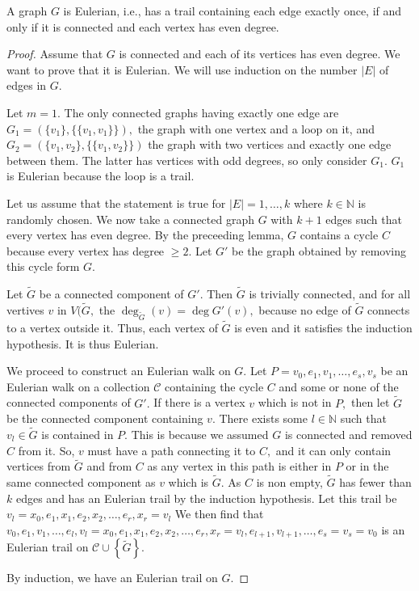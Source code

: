 \begin{theorem}
	A graph $G$ is Eulerian, i.e., has a trail containing each edge exactly once, if and only if it is connected and each vertex has even degree.
\end{theorem}
\begin{proof}
	Assume that $G$ is connected and each of its vertices has even degree. We want to prove that it is Eulerian. We will use induction on the number $ \lvert E \rvert$ of edges in $G.$

	Let $m = 1.$ The only connected graphs having exactly one edge are $ G_1 =  ( \{v_1\}, \{\{v_1,v_1\}\} ),$ the graph with one vertex and a loop on it, and $G_2 = ( \{v_1, v_2\}, \{\{v_1,v_2\}\})$ the graph with two vertices and exactly one edge between them. The latter has vertices with odd degrees, so only consider $G_1.$
$G_1$ is Eulerian because the loop is a trail.

Let us assume that the statement is true for $ \lvert E \rvert = 1, \dotsc, k$ where $k \in \mathbb{N}$ is randomly chosen.
We now take a connected graph $G$ with $k+1$ edges such that every vertex has even degree.
By the preceeding lemma, $G$ contains a cycle $C$ because every vertex has degree $\geq 2.$
Let $G'$ be the graph obtained by removing this cycle form $G.$

Let $\tilde{G}$ be a connected component of $G'.$
Then $\tilde{G}$ is trivially connected, and for all vertives $v$ in $V(\tilde{G},$
the $\deg_{\tilde{G}}(v) = \deg{G'}(v),$ because no edge of $\tilde{G}$ connects to a
vertex outside it.
Thus, each vertex of $\tilde{G}$ is even and it satisfies the induction hypothesis.
It is thus Eulerian.

We proceed to construct an Eulerian walk on $G.$
Let $P = v_0, e_1, v_1, \dotsc, e_s, v_s$ be an Eulerian walk on a collection $ \mathcal{C}$
containing
the cycle $C$ and some or none of the connected components of $G'.$
If there is a vertex $v$ which is not in $P,$ then let $\tilde{G}$ be the connected component 
containing $v.$
There exists some $l \in \mathbb{N}$ such that $v_l \in \tilde{G}$ is contained in $P.$
This is because we assumed $G$ is connected and removed $C$ from it.
So, $v$ must have a path connecting it to $C,$ and it can only contain vertices
from $\tilde{G}$ and from $C$ as any vertex in this path is either in $P$ 
or in the same connected component as $v$ which is $\tilde{G}.$
As $C$ is non empty, $\tilde{G}$ has fewer than $k$ edges and has an Eulerian trail
by the induction hypothesis. Let this trail be 
$ v_l = x_0, e_1, x_1, e_2, x_2, \dotsc, e_r, x_r = v_l$
We then find that 
$  v_0, e_1, v_1, \dotsc, e_l,v_l = x_0, e_1, x_1, e_2, x_2, \dotsc, e_r, x_r = v_l, e_{l+1}, v_{l+1}, \dotsc, 
e_s = v_s = v_0$
is an Eulerian trail on $\mathcal{C} \cup \left\{ \tilde{G} \right\}.$

By induction, we have an Eulerian trail on $G.$

\end{proof}

